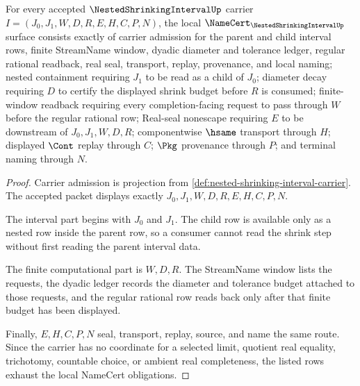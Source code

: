 \begin{theorem}
\label{thm:nested-shrinking-interval-namecert-obligations}
For every accepted $\NestedShrinkingIntervalUp$ carrier $I=(J_0,J_1,W,D,R,E,H,C,P,N)$, the local $\NameCert_{\NestedShrinkingIntervalUp}$ surface consists exactly of carrier admission for the parent and child interval rows, finite StreamName window, dyadic diameter and tolerance ledger, regular rational readback, real seal, transport, replay, provenance, and local naming; nested containment requiring $J_1$ to be read as a child of $J_0$; diameter decay requiring $D$ to certify the displayed shrink budget before $R$ is consumed; finite-window readback requiring every completion-facing request to pass through $W$ before the regular rational row; Real-seal nonescape requiring $E$ to be downstream of $J_0,J_1,W,D,R$; componentwise $\hsame$ transport through $H$; displayed $\Cont$ replay through $C$; $\Pkg$ provenance through $P$; and terminal naming through $N$.
\end{theorem}
\begin{proof}
Carrier admission is projection from \autoref{def:nested-shrinking-interval-carrier}. The accepted packet displays exactly $J_0,J_1,W,D,R,E,H,C,P,N$.

The interval part begins with $J_0$ and $J_1$. The child row is available only as a nested row inside the parent row, so a consumer cannot read the shrink step without first reading the parent interval data.

The finite computational part is $W,D,R$. The StreamName window lists the requests, the dyadic ledger records the diameter and tolerance budget attached to those requests, and the regular rational row reads back only after that finite budget has been displayed.

Finally, $E,H,C,P,N$ seal, transport, replay, source, and name the same route. Since the carrier has no coordinate for a selected limit, quotient real equality, trichotomy, countable choice, or ambient real completeness, the listed rows exhaust the local NameCert obligations.
\end{proof}

